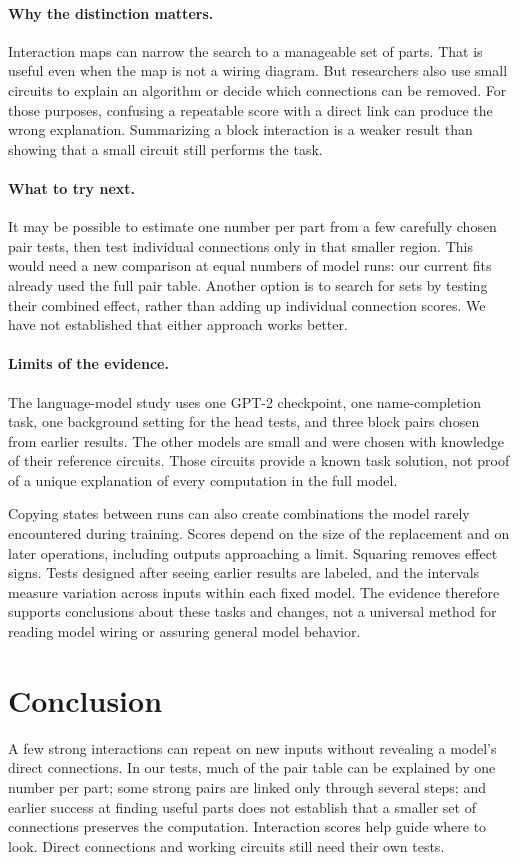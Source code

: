 \documentclass[11pt]{article}
\begin{document}
\paragraph{Why the distinction matters.}
Interaction maps can narrow the search to a manageable set of parts. That is
useful even when the map is not a wiring diagram. But researchers also use
small circuits to explain an algorithm or decide which connections can be
removed. For those purposes, confusing a repeatable score with a direct link
can produce the wrong explanation. Summarizing a block interaction is a
weaker result than showing that a small circuit still performs the task.

\paragraph{What to try next.}
It may be possible to estimate one number per part from a few carefully chosen
pair tests, then test individual connections only in that smaller region.
This would need a new comparison at equal numbers of model runs: our current
fits already used the full pair table. Another option is to search for sets
by testing their combined effect, rather than adding up individual connection
scores. We have not established that either approach works better.

\paragraph{Limits of the evidence.}
The language-model study uses one GPT-2 checkpoint, one name-completion task,
one background setting for the head tests, and three block pairs chosen from
earlier results. The other models are small and were chosen with knowledge of
their reference circuits. Those circuits provide a known task solution, not
proof of a unique explanation of every computation in the full model.

Copying states between runs can also create combinations the model rarely
encountered during training. Scores depend on the size of the replacement and
on later operations, including outputs approaching a limit. Squaring removes
effect signs. Tests designed after seeing earlier results are labeled, and
the intervals measure variation across inputs within each fixed model. The
evidence therefore supports conclusions about these tasks and changes, not
a universal method for reading model wiring or assuring general model behavior.

\section{Conclusion}
A few strong interactions can repeat on new inputs without revealing a model's
direct connections. In our tests, much of the pair table can be explained by
one number per part; some strong pairs are linked only through several steps;
and earlier success at finding useful parts does not establish that a smaller
set of connections preserves the computation. Interaction scores help guide
where to look. Direct connections and working circuits still need their own tests.
\end{document}
